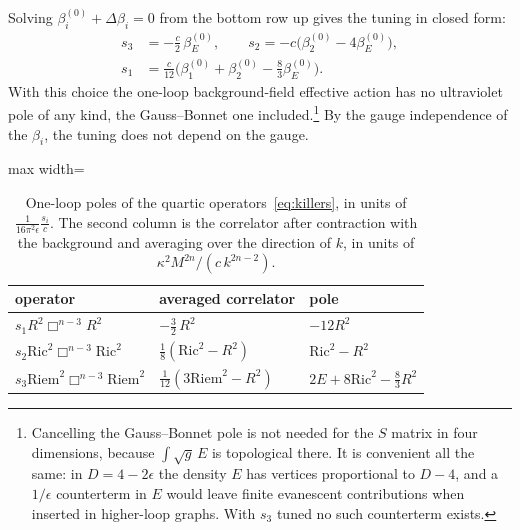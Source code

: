 \documentclass[a4paper,11pt]{article}
\newcommand{\Ric}{\mathrm{Ric}}
\newcommand{\Riem}{\mathrm{Riem}}
\begin{document}
Solving $\beta_i^{(0)}+\Delta\beta_i=0$ from the bottom row up gives the tuning in closed form:
\begin{equation}
\label{eq:tuning}
\begin{aligned}
s_3&=-\tfrac c2\,\beta_E^{(0)},\qquad s_2=-c\bigl(\beta_2^{(0)}-4\beta_E^{(0)}\bigr),\\
s_1&=\tfrac c{12}\bigl(\beta_1^{(0)}+\beta_2^{(0)}-\tfrac83\beta_E^{(0)}\bigr).
\end{aligned}
\end{equation}
With this choice the one-loop background-field effective action has no ultraviolet pole of any kind, the Gauss--Bonnet one included.\footnote{Cancelling the Gauss--Bonnet pole is not needed for the $S$ matrix in four dimensions, because $\int\sqrt g\,E$ is topological there. It is convenient all the same: in $D=4-2\epsilon$ the density $E$ has vertices proportional to $D-4$, and a $1/\epsilon$ counterterm in $E$ would leave finite evanescent contributions when inserted in higher-loop graphs. With $s_3$ tuned no such counterterm exists.} By the gauge independence of the $\beta_i$, the tuning does not depend on the gauge.

\begin{table}[t]
\centering
\small\begin{adjustbox}{max width=\linewidth}\begin{tabular}{lll}
\hline\hline
operator & averaged correlator & pole\\
\hline
$s_1R^2\Box^{n-3}R^2$ & $-\frac32\,R^2$ & $-12R^2$\\
$s_2\Ric^2\Box^{n-3}\Ric^2$ & $\frac18(\Ric^2-R^2)$ & $\Ric^2-R^2$\\
$s_3\Riem^2\Box^{n-3}\Riem^2$ & $\frac1{12}(3\Riem^2-R^2)$ & $2E+8\Ric^2-\frac83R^2$\\
\hline\hline
\end{tabular}\end{adjustbox}
\caption{One-loop poles of the quartic operators~\eqref{eq:killers}, in units of $\frac{1}{16\pi^2\epsilon}\frac{s_i}{c}$. The second column is the correlator after contraction with the background and averaging over the direction of $k$, in units of $\kappa^2M^{2n}/(c\,k^{2n-2})$.}
\label{tab:killers}
\end{table}
\end{document}
